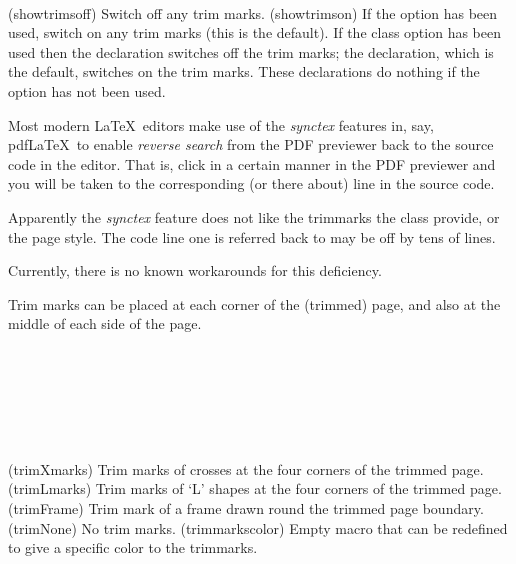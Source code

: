 \begin{syntax}
\cmd{\showtrimsoff} \cmd{\showtrimson} \\
\end{syntax}
\glossary(showtrimsoff)%
  {}%
  {Switch off any trim marks.}
\glossary(showtrimson)%
  {}%
  {If the  option has been used, switch on any trim marks 
  (this is the default).}
If the  class option has been used then the \cmd{\showtrimsoff}
declaration switches off the trim marks; the \cmd{\showtrimson} declaration,
which is the default, switches on the trim marks. These declarations do
nothing if the  option has not been used.

\begin{caveat}
  Most modern \LaTeX\ editors make use of the \emph{synctex} features
  in, say, pdf\LaTeX\ to enable \emph{reverse search} from the PDF
  previewer back to the source code in the editor. That is, click in a
  certain manner in the PDF previewer and you will be taken to the
  corresponding (or there about) line in the source code.

  Apparently the \emph{synctex} feature does not like the trimmarks
  the class provide, or the  page style. The code
  line one is referred back to may be off by tens of lines.

  Currently, there is no known workarounds for this deficiency.
\end{caveat}



    Trim marks can be placed at each corner of the (trimmed) page, and also
at the middle of each side of the page.

\begin{syntax}
\cmd{\trimXmarks} \\
\cmd{\trimLmarks} \\
\cmd{\trimFrame} \\
\cmd{\trimNone} \\
\cmd{\trimmarkscolor} \\
\end{syntax}
\glossary(trimXmarks)%
  {}%
  {Trim marks of crosses at the four corners of the trimmed page.}
\glossary(trimLmarks)%
  {}%
  {Trim marks of `L' shapes at the four corners of the trimmed page.}
\glossary(trimFrame)%
  {}%
  {Trim mark of a frame drawn round the trimmed page boundary.}
\glossary(trimNone)%
  {}%
  {No trim marks.}
\glossary(trimmarkscolor)%
  {}%
  {Empty macro that can be redefined to give a specific color to the trimmarks.}

